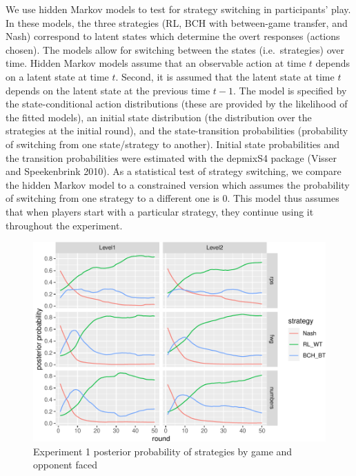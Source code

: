 \documentclass[smallextended]{svjour3}       %
\begin{document}
We use hidden Markov models to test for strategy switching in
participants' play. In these models, the three strategies (RL, BCH with
between-game transfer, and Nash) correspond to latent states which
determine the overt responses (actions chosen). The models allow for
switching between the states (i.e.~strategies) over time. Hidden Markov
models assume that an observable action at time \(t\) depends on a
latent state at time \(t\). Second, it is assumed that the latent state
at time \(t\) depends on the latent state at the previous time \(t-1\).
The model is specified by the state-conditional action distributions
(these are provided by the likelihood of the fitted models), an initial
state distribution (the distribution over the strategies at the initial
round), and the state-transition probabilities (probability of switching
from one state/strategy to another). Initial state probabilities and the
transition probabilities were estimated with the depmixS4 package
(Visser and Speekenbrink 2010). As a statistical test of strategy
switching, we compare the hidden Markov model to a constrained version
which assumes the probability of switching from one strategy to a
different one is 0. This model thus assumes that when players start with
a particular strategy, they continue using it throughout the experiment.

\begin{figure}

{\centering \includegraphics[width=\textwidth]{CBB_v2_files/figure-latex/exp1-posteriors-plot-1} 

}

\caption{Experiment 1 posterior probability of strategies by game and opponent faced}\label{fig:exp1-posteriors-plot}
\end{figure}
\end{document}
